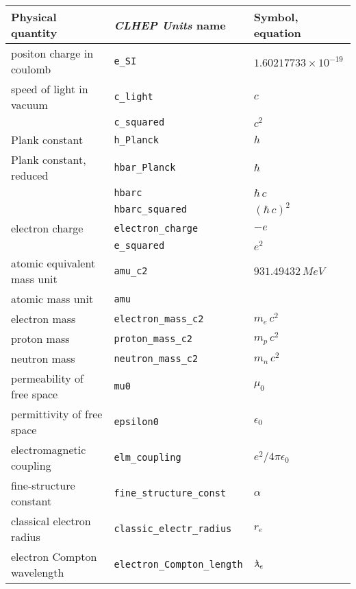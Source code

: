 \begin{table}
\centering
\begin{tabular}{|l|l|l|}
\hline
\bf{Physical quantity}    &\bf{{\it CLHEP Units} name}&\bf{Symbol, equation}  \\
\hline
positon charge in coulomb &{\tt e\_{}SI}         &$ 1.60217733\times10^{-19}$\\
speed of light in vacuum  &{\tt c\_{}light}      &$ c                      $\\
                          &{\tt c\_{}squared}    &$ c^2                    $\\
Plank constant            &{\tt h\_{}Planck}     &$ h                      $\\
Plank constant, reduced   &{\tt hbar\_{}Planck}  &$ \hbar                  $\\
                          &{\tt hbarc}           &$ \hbar\,c               $\\
                          &{\tt hbarc\_{}squared}&$ (\hbar\,c)^2           $\\
electron charge           &{\tt electron\_{}charge}&$ -e                   $\\
                          &{\tt e\_{}squared}    &$ e^2                    $\\
atomic equivalent mass unit&{\tt amu\_{}c2}      &$ 931.49432\,MeV         $\\
atomic mass unit          &{\tt amu}             &                          \\
electron mass             &{\tt electron\_{}mass\_{}c2}&$ m_e\,c^2         $\\
proton mass               &{\tt proton\_{}mass\_{}c2}  &$ m_p\,c^2         $\\
neutron mass              &{\tt neutron\_{}mass\_{}c2} &$ m_n\,c^2         $\\
permeability of free space&{\tt mu0}             &$ \mu_0                  $\\
permittivity of free space&{\tt epsilon0}        &$ \epsilon_0             $\\
electromagnetic coupling  &{\tt elm\_{}coupling} &$ e^2/4\pi\epsilon_0     $\\
fine-structure constant   &{\tt fine\_{}structure\_{}const} &$ \alpha      $\\
classical electron radius &{\tt classic\_{}electr\_{}radius}&$  r_e        $\\
electron Compton wavelength&{\tt electron\_{}Compton\_{}length}&$ \lbar_e  $\\

\end{tabular}
\end{table}
